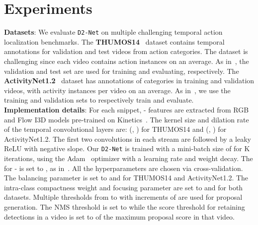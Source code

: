 \documentclass[10pt,twocolumn,letterpaper]{article}
\def\proposed{\texttt{D2-Net}{}}
\begin{document}
\section{Experiments}
\noindent\textbf{Datasets}: We evaluate \proposed{} on multiple challenging temporal action localization benchmarks.
The \textbf{THUMOS14}~\cite{thumos14} dataset contains temporal annotations for  validation and  test videos from  action categories. The dataset is challenging since each video contains  action instances on an average. As in~\cite{wtalc,refineloc}, the validation and test set are used for training and evaluating, respectively. 
The \textbf{ActivityNet1.2}~\cite{activitynet} dataset has annotations of  categories in  training and  validation videos, with  activity instances per video on an average. As in~\cite{autoloc,wtalc}, we use the training and validation sets to respectively train and evaluate.\\
\textbf{Implementation details}: 
For each snippet, - features are extracted from RGB and Flow I3D models pre-trained on Kinetics~\cite{kinetics}. 
The kernel size and dilation rate of the temporal convolutional layers are: (, ) for THUMOS14 and (, ) for ActivityNet1.2. The first two convolutions in each stream are followed by a leaky ReLU with  negative slope. Our \proposed{} is trained with a mini-batch size of  for K iterations, using the Adam~\cite{adam} optimizer with a  learning rate and  weight decay.
The  for - is set to , as in~\cite{wtalc,3cnet}.
All the hyperparameters are chosen via cross-validation. The balancing parameter  is set to  and  for THUMOS14 and ActivityNet1.2. The intra-class compactness weight  and focusing parameter  are set to  and  for both datasets. Multiple thresholds from  to  with increments of  are used for proposal generation. The NMS threshold is set to  while the score threshold  for retaining detections in a video is set to  of the maximum proposal score in that video. 
\end{document}
